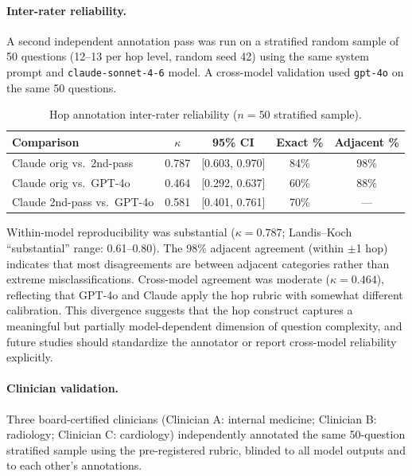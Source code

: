 \documentclass{article}
\begin{document}
\paragraph{Inter-rater reliability.}
A second independent annotation pass was run on a stratified random sample of
50 questions (12--13 per hop level, random seed 42) using the same system
prompt and \texttt{claude-sonnet-4-6} model. A cross-model validation used
\texttt{gpt-4o} on the same 50 questions.

\begin{table}[h]
\centering
\caption{Hop annotation inter-rater reliability ($n = 50$ stratified sample).}
\label{tab:hop_kappa}
\small
\begin{tabular}{lcccc}
\toprule
\textbf{Comparison} & \textbf{$\kappa$} & \textbf{95\% CI} & \textbf{Exact \%} & \textbf{Adjacent \%} \\
\midrule
Claude orig vs.\ 2nd-pass & 0.787 & [0.603, 0.970] & 84\% & 98\% \\
Claude orig vs.\ GPT-4o   & 0.464 & [0.292, 0.637] & 60\% & 88\% \\
Claude 2nd-pass vs.\ GPT-4o & 0.581 & [0.401, 0.761] & 70\% & --- \\
\bottomrule
\end{tabular}
\end{table}

Within-model reproducibility was substantial ($\kappa = 0.787$; Landis--Koch
``substantial'' range: 0.61--0.80). The 98\% adjacent agreement (within $\pm$1
hop) indicates that most disagreements are between adjacent categories rather
than extreme misclassifications. Cross-model agreement was moderate
($\kappa = 0.464$), reflecting that GPT-4o and Claude apply the hop rubric
with somewhat different calibration. This divergence suggests that the hop
construct captures a meaningful but partially model-dependent dimension of
question complexity, and future studies should standardize the annotator or
report cross-model reliability explicitly.

\paragraph{Clinician validation.}
Three board-certified clinicians (Clinician A: internal medicine; Clinician B:
radiology; Clinician C: cardiology) independently annotated the same 50-question
stratified sample using the pre-registered rubric, blinded to all model outputs
and to each other's annotations.
\end{document}

